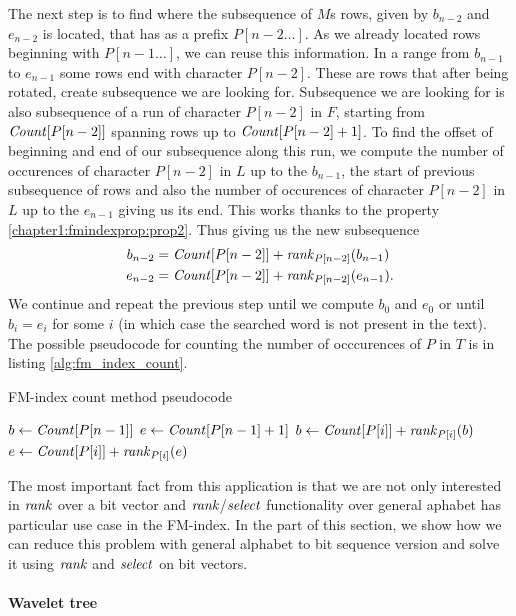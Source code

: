 The next step is to find where the subsequence of $M$s rows, given by $b_{n-2}$ and $e_{n-2}$ is located,
that has as a prefix $P[n-2\ldots]$. As we already located rows beginning with $P[n-1\ldots]$, we can reuse
this information. In a range from $b_{n-1}$ to $e_{n-1}$ some rows end with character $P[n-2]$. These are rows
that after being rotated, create subsequence we are looking for. Subsequence we are looking for is also
subsequence of a run of character $P[n-2]$ in $F$, starting from $\mathit{Count}[P[n-2]]$ spanning rows up to
$\mathit{Count}[P[n-2]+1]$. To find the offset of beginning and end of our subsequence along this run, we compute the
number of occurences of character $P[n-2]$ in $L$ up to the $b_{n-1}$, the start of previous subsequence of
rows and also the number of occurences of character $P[n-2]$ in $L$ up to the $e_{n-1}$ giving us its end.
This works thanks to the property \ref{chapter1:fmindexprop:prop2}. Thus giving us the new subsequence
\begin{align*}
	b_{n-2}&=\mathit{Count}[P[n-2]] + \mathit{rank}_{P[n-2]}(b_{n-1}) \\
	e_{n-2}&=\mathit{Count}[P[n-2]] + \mathit{rank}_{P[n-2]}(e_{n-1}).\\
\end{align*}
We continue and repeat the previous step until we compute $b_0$ and $e_0$ or until $b_i=e_i$ for some $i$
(in which case the searched word is not present in the text). The possible pseudocode for counting the number
of occcurences of $P$ in $T$ is in listing \ref{alg:fm_index_count}.

\begin{algorithm}
\caption{FM-index count method pseudocode}\label{alg:fm_index_count}
$b \gets \mathit{Count}[P[n-1]]$\;
$e \gets \mathit{Count}[P[n-1]+1]$\;
 {
	$b \gets \mathit{Count}[P[i]] + \mathit{rank}_{P[i]}(b)$\;
	$e \gets \mathit{Count}[P[i]] + \mathit{rank}_{P[i]}(e)$\;
}
\end{algorithm}

The most important fact from this application is that we are not only interested in $\mathit{rank}$ over a bit vector
and $\mathit{rank}$/$\mathit{select}$ functionality over general aphabet has particular use case in the FM-index. In the part
of this section, we show how we can reduce this problem with general alphabet to bit sequence version and
solve it using $\mathit{rank}$ and $\mathit{select}$ on bit vectors.

\paragraph{Wavelet tree}
\label{section:WaweletTree}

